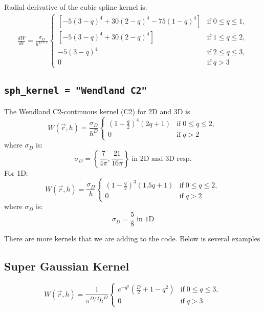 \documentclass[notes.tex]{subfiles}
\begin{document}
Radial derivative of the cubic spline kernel is:
\begin{align}
 \frac{dW}{dr} = \frac{\sigma_D}{h^{D+1}} 
  \begin{cases}
    [-5(3-q)^4+30(2-q)^4-75(1-q)^4] & \text{if} \; 0 \leq q \leq 1, \\
    [-5(3-q)^4 + 30(2-q)^4] & \text{if} \; 1 \leq q \leq 2, \\
   -5(3-q)^4 & \text{if} \; 2 \leq q \leq 3, \\
    0        & \text{if} \;  q >3 
\end{cases}
\end{align}


\subsection{{\tt sph\_kernel = "Wendland C2"}}
The Wendland C2-continuous kernel (C2) for 2D and 3D is
\begin{equation}
W(\vec{r},h) = \frac{\sigma_D}{h^D} 
  \begin{cases}
    \left(1-\frac{q}{2} \right)^4 (2q+1) & \text{if} \; 0 \leq q \leq 2, \\
    0        & \text{if} \;  q > 2 
\end{cases}
\end{equation}
where $\sigma_D$ is:
\begin{equation}
\sigma_D =  \left\{ \frac{7}{4 \pi}, \frac{21}{16\pi}\right\}
         \; \text{in 2D and 3D resp.}
\end{equation}
For 1D:
\begin{equation}
W(\vec{r},h) = \frac{\sigma_D}{h} 
  \begin{cases}
    \left(1-\frac{q}{2} \right)^3 (1.5q+1) & \text{if} \; 0 \leq q \leq 2, \\
    0        & \text{if} \;  q > 2 
\end{cases}
\end{equation}
where $\sigma_D$ is:
\begin{equation}
\sigma_D =  \frac{5}{8}
         \; \text{in 1D}
\end{equation}


There are more kernels that we are adding to the code. Below is several examples
\subsection{Super Gaussian Kernel}
\begin{equation}
W(\vec{r},h) = \frac{1}{\pi^{D/2} h^D} 
  \begin{cases}
    e^{-q^2} \left(\frac{D}{2} + 1 - q^2 \right) & \text{if} \; 0 \leq q \leq 3, \\
    0        & \text{if} \;  q >3 
    \end{cases}
\end{equation}
\end{document}
